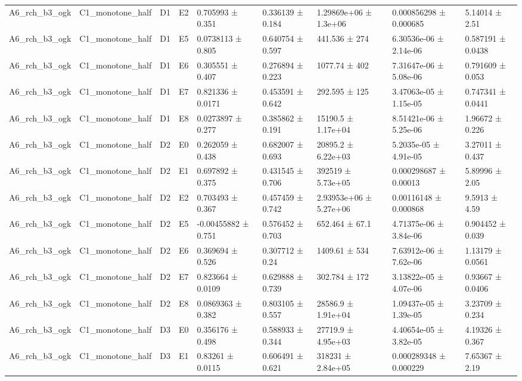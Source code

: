 \begin{table}
\begin{tabular}{lllllllll}
A6\_rch\_b3\_ogk & C1\_monotone\_half & D1 & E2 & 0.705993 ± 0.351 & 0.336139 ± 0.184 & 1.29869e+06 ± 1.3e+06 & 0.000856298 ± 0.000685 & 5.14014 ± 2.51 \\
A6\_rch\_b3\_ogk & C1\_monotone\_half & D1 & E5 & 0.0738113 ± 0.805 & 0.640754 ± 0.597 & 441.536 ± 274 & 6.30536e-06 ± 2.14e-06 & 0.587191 ± 0.0438 \\
A6\_rch\_b3\_ogk & C1\_monotone\_half & D1 & E6 & 0.305551 ± 0.407 & 0.276894 ± 0.223 & 1077.74 ± 402 & 7.31647e-06 ± 5.08e-06 & 0.791609 ± 0.053 \\
A6\_rch\_b3\_ogk & C1\_monotone\_half & D1 & E7 & 0.821336 ± 0.0171 & 0.453591 ± 0.642 & 292.595 ± 125 & 3.47063e-05 ± 1.15e-05 & 0.747341 ± 0.0441 \\
A6\_rch\_b3\_ogk & C1\_monotone\_half & D1 & E8 & 0.0273897 ± 0.277 & 0.385862 ± 0.191 & 15190.5 ± 1.17e+04 & 8.51421e-06 ± 5.25e-06 & 1.96672 ± 0.226 \\
A6\_rch\_b3\_ogk & C1\_monotone\_half & D2 & E0 & 0.262059 ± 0.438 & 0.682007 ± 0.693 & 20895.2 ± 6.22e+03 & 5.2035e-05 ± 4.91e-05 & 3.27011 ± 0.437 \\
A6\_rch\_b3\_ogk & C1\_monotone\_half & D2 & E1 & 0.697892 ± 0.375 & 0.431545 ± 0.706 & 392519 ± 5.73e+05 & 0.000298687 ± 0.00013 & 5.89996 ± 2.05 \\
A6\_rch\_b3\_ogk & C1\_monotone\_half & D2 & E2 & 0.703493 ± 0.367 & 0.457459 ± 0.742 & 2.93953e+06 ± 5.27e+06 & 0.00116148 ± 0.000868 & 9.5913 ± 4.59 \\
A6\_rch\_b3\_ogk & C1\_monotone\_half & D2 & E5 & -0.00455882 ± 0.751 & 0.576452 ± 0.703 & 652.464 ± 67.1 & 4.71375e-06 ± 3.84e-06 & 0.904452 ± 0.039 \\
A6\_rch\_b3\_ogk & C1\_monotone\_half & D2 & E6 & 0.369694 ± 0.526 & 0.307712 ± 0.24 & 1409.61 ± 534 & 7.63912e-06 ± 7.62e-06 & 1.13179 ± 0.0561 \\
A6\_rch\_b3\_ogk & C1\_monotone\_half & D2 & E7 & 0.823664 ± 0.0109 & 0.629888 ± 0.739 & 302.784 ± 172 & 3.13822e-05 ± 4.07e-06 & 0.93667 ± 0.0406 \\
A6\_rch\_b3\_ogk & C1\_monotone\_half & D2 & E8 & 0.0869363 ± 0.382 & 0.803105 ± 0.557 & 28586.9 ± 1.91e+04 & 1.09437e-05 ± 1.39e-05 & 3.23709 ± 0.234 \\
A6\_rch\_b3\_ogk & C1\_monotone\_half & D3 & E0 & 0.356176 ± 0.498 & 0.588933 ± 0.344 & 27719.9 ± 4.95e+03 & 4.40654e-05 ± 3.82e-05 & 4.19326 ± 0.367 \\
A6\_rch\_b3\_ogk & C1\_monotone\_half & D3 & E1 & 0.83261 ± 0.0115 & 0.606491 ± 0.621 & 318231 ± 2.84e+05 & 0.000289348 ± 0.000229 & 7.65367 ± 2.19 \\

\end{tabular}
\end{table}

